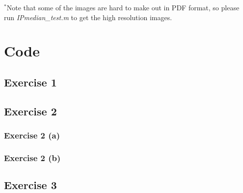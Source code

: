 \documentclass{article}
\begin{document}
$^*$Note that some of the images are hard to make out in PDF format, so please run \textit{IPmedian\_test.m} to get the high resolution images.


\typeout{}


\appendix
\section{Code}
\subsection{Exercise 1}

\subsection{Exercise 2}
\subsubsection{Exercise 2 (a)}


\subsubsection{Exercise 2 (b)}

\subsection{Exercise 3}

\end{document}
